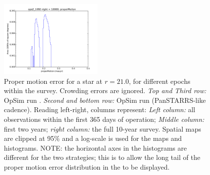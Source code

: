 \begin{figure}[ht]
\begin{center}
  \includegraphics[width=2.0in]{./figs/milkyway/MW_Astrom_pmError_1092_10y_hst.pdf}
  \end{center}
  \caption{Proper motion error for a star at $r=21.0$, for different epochs within the survey. Crowding errors are ignored. {\it Top and Third row:} OpSim run . {\it Second and bottom row:} OpSim run  (PanSTARRS-like cadence). Reading left-right, columns represent: {\it Left column:} all observations within the first 365 days of operation; {\it Middle column:} first two years; {\it right column:} the full 10-year survey. Spatial maps are clipped at 95\% and a log-scale is used for the maps and histograms. NOTE: the horizontal axes in the histograms are different for the two strategies; this is to allow the long tail of the proper motion error distribution in the  to be displayed.}
  \label{fig_astrom_ByTime_pmError}
\end{figure}


